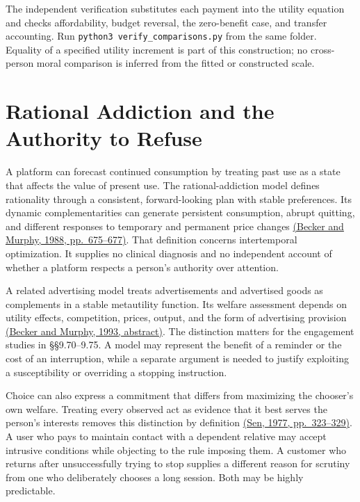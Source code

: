 The independent verification substitutes each payment into the utility
equation and checks affordability, budget reversal, the zero-benefit
case, and transfer accounting. Run
\texttt{python3\ verify\_comparisons.py} from the same folder. Equality
of a specified utility increment is part of this construction; no
cross-person moral comparison is inferred from the fitted or constructed
scale.


\hypertarget{M09-rational-addiction-and-the-authority-to-refuse}{%
\section{Rational Addiction and the Authority to
Refuse}\label{M09-rational-addiction-and-the-authority-to-refuse}}

\noindent \noindent A platform can forecast continued consumption by treating past
use as a state that affects the value of present use. The
rational-addiction model defines rationality through a consistent,
forward-looking plan with stable preferences. Its dynamic
complementarities can generate persistent consumption, abrupt quitting,
and different responses to temporary and permanent price changes
\href{https://doi.org/10.1086/261558}{(Becker and Murphy, 1988,
pp.~675--677)}. That definition concerns intertemporal optimization. It
supplies no clinical diagnosis and no independent account of whether a
platform respects a person's authority over attention.

A related advertising model treats advertisements and advertised goods
as complements in a stable metautility function. Its welfare assessment
depends on utility effects, competition, prices, output, and the form of
advertising provision \href{https://doi.org/10.2307/2118455}{(Becker and
Murphy, 1993, abstract)}. The distinction matters for the engagement
studies in §§9.70--9.75. A model may represent the benefit of a reminder
or the cost of an interruption, while a separate argument is needed to
justify exploiting a susceptibility or overriding a stopping
instruction.

Choice can also express a commitment that differs from maximizing the
chooser's own welfare. Treating every observed act as evidence that it
best serves the person's interests removes this distinction by
definition \href{https://www.jstor.org/stable/2264946}{(Sen, 1977,
pp.~323--329)}. A user who pays to maintain contact with a dependent
relative may accept intrusive conditions while objecting to the rule
imposing them. A customer who returns after unsuccessfully trying to
stop supplies a different reason for scrutiny from one who deliberately
chooses a long session. Both may be highly predictable.

